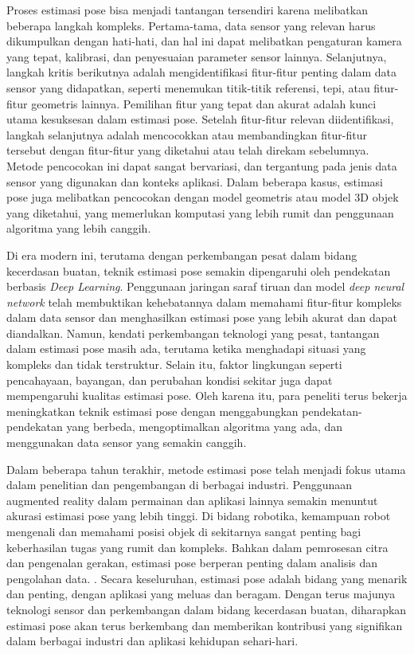 Proses estimasi pose bisa menjadi tantangan tersendiri karena melibatkan beberapa langkah kompleks. Pertama-tama, data sensor yang relevan harus dikumpulkan dengan hati-hati, dan hal ini dapat melibatkan pengaturan kamera yang tepat, kalibrasi, dan penyesuaian parameter sensor lainnya. Selanjutnya, langkah kritis berikutnya adalah mengidentifikasi fitur-fitur penting dalam data sensor yang didapatkan, seperti menemukan titik-titik referensi, tepi, atau fitur-fitur geometris lainnya. Pemilihan fitur yang tepat dan akurat adalah kunci utama kesuksesan dalam estimasi pose. Setelah fitur-fitur relevan diidentifikasi, langkah selanjutnya adalah mencocokkan atau membandingkan fitur-fitur tersebut dengan fitur-fitur yang diketahui atau telah direkam sebelumnya. Metode pencocokan ini dapat sangat bervariasi, dan tergantung pada jenis data sensor yang digunakan dan konteks aplikasi. Dalam beberapa kasus, estimasi pose juga melibatkan pencocokan dengan model geometris atau model 3D objek yang diketahui, yang memerlukan komputasi yang lebih rumit dan penggunaan algoritma yang lebih canggih.  \cite{Andriluka_2014_CVPR}

Di era modern ini, terutama dengan perkembangan pesat dalam bidang kecerdasan buatan, teknik estimasi pose semakin dipengaruhi oleh pendekatan berbasis \textit{Deep Learning}. Penggunaan jaringan saraf tiruan dan model \textit{deep neural network} telah membuktikan kehebatannya dalam memahami fitur-fitur kompleks dalam data sensor dan menghasilkan estimasi pose yang lebih akurat dan dapat diandalkan. Namun, kendati perkembangan teknologi yang pesat, tantangan dalam estimasi pose masih ada, terutama ketika menghadapi situasi yang kompleks dan tidak terstruktur. Selain itu, faktor lingkungan seperti pencahayaan, bayangan, dan perubahan kondisi sekitar juga dapat mempengaruhi kualitas estimasi pose. Oleh karena itu, para peneliti terus bekerja meningkatkan teknik estimasi pose dengan menggabungkan pendekatan-pendekatan yang berbeda, mengoptimalkan algoritma yang ada, dan menggunakan data sensor yang semakin canggih.

Dalam beberapa tahun terakhir, metode estimasi pose telah menjadi fokus utama dalam penelitian dan pengembangan di berbagai industri. Penggunaan augmented reality dalam permainan dan aplikasi lainnya semakin menuntut akurasi estimasi pose yang lebih tinggi. Di bidang robotika, kemampuan robot mengenali dan memahami posisi objek di sekitarnya sangat penting bagi keberhasilan tugas yang rumit dan kompleks. Bahkan dalam pemrosesan citra dan pengenalan gerakan, estimasi pose berperan penting dalam analisis dan pengolahan data. \cite{Toshev_2014_CVPR} . Secara keseluruhan, estimasi pose adalah bidang yang menarik dan penting, dengan aplikasi yang meluas dan beragam. Dengan terus majunya teknologi sensor dan perkembangan dalam bidang kecerdasan buatan, diharapkan estimasi pose akan terus berkembang dan memberikan kontribusi yang signifikan dalam berbagai industri dan aplikasi kehidupan sehari-hari.

